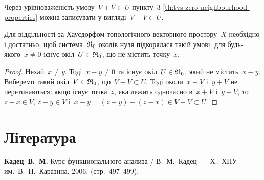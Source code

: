 \begin{remark}
    Через урівноваженість умову~$V + V \subset U$ пункту~3 \cref{th:tvs-zero-neighbourhood-properties} можна записувати у вигляді~$V - V \subset U$.
\end{remark}

\begin{theorem}
    Для віддільності за Хаусдорфом топологічного векторного простору~$X$ необхідно і достатньо, щоб система~$\frak R_0$ околів нуля підкорялася такій умові: для будь-якого~$x \ne 0$ існує окіл~$U \in \frak R_0$, що не містить точку~$x$.
\end{theorem}

\begin{proof}
    Нехай~$x \ne y$. Тоді~$x - y \ne 0$ та існує окіл~$U \in \frak R_0$, який не містить~$x - y$. Виберемо такий окіл~$V \in \frak R_0$, що~$V - V \subset U$. Тоді околи~$x + V$ і~$y + V$ не перетинаються: якщо існує точка~$z$, яка лежить одночасно в~$x + V$ і~$y + V$, то~$z - x \in V$, $z - y \in V$ і~$x - y =(z - y) -(z - x) \in V - V \subset U$.
\end{proof}

\section{Література}

\begin{enumerate}[label={[\arabic*]}]
\item \textbf{Кадец~В.~М.}
Курс функционального анализа /
В.~М.~Кадец~---
Х.: ХНУ им.~В.~Н.~Каразина, 2006. (стр.~497--499).
\end{enumerate}
